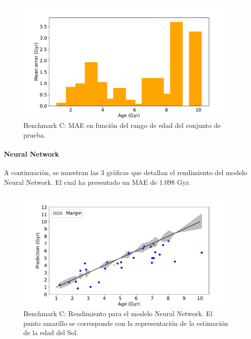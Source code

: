 \begin{figure}[H]
\begin{center}
 \includegraphics[width=0.8\linewidth]{Figuras/Experimentos/B_C_stacking_3.pdf}
\end{center}
\caption{Benchmark C: MAE en función del rango de edad del conjunto de prueba.}
 \label{fig:benchC_details_stacking_3}
\end{figure}

\paragraph{Neural Network} 
A continuación, se muestran las 3 gráficas que detallan el rendimiento del modelo Neural Network. El cual ha presentado un MAE de 1.098 Gyr.

\begin{figure}[H]
\begin{center}
 \includegraphics[width=0.8\linewidth]{Figuras/Experimentos/B_C_nnet_1.pdf}
\end{center}
\caption{Benchmark C: Rendimiento para el modelo Neural Network. El punto amarillo se corresponde con la representación de la estimación de la edad del Sol.}
 \label{fig:benchC_details_nnet_1}
\end{figure}

